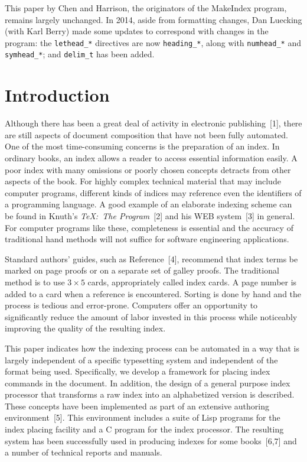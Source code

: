 This paper by Chen and Harrison, the originators of the MakeIndex
program, remains largely unchanged.  In 2014, aside from formatting
changes, Dan Luecking (with Karl Berry) made some updates to correspond
with changes in the program: the \verb|lethead_*| directives are now
\verb|heading_*|, along with \verb|numhead_*| and \verb|symhead_*|; and
\verb|delim_t| has been added.

\section{Introduction}
Although there has been a great deal of activity in
electronic publishing~[1],
there are still aspects of document composition that have not been
fully automated.
One of the most time-consuming concerns is the preparation of an index.
In ordinary books, an index allows a reader to
access essential information easily.
A poor index with many omissions or poorly chosen concepts
detracts from other aspects of the book.
For highly complex technical material that may include computer programs,
different kinds of indices may
reference even the identifiers of a programming language.  A good example
of an elaborate indexing scheme can be found in Knuth's
{\it {\TeX}:\ The Program\/}~[2] and his WEB system~[3] in general.
For computer programs like these,
completeness is essential and the accuracy of
traditional hand methods will not suffice for software engineering
applications.

Standard authors' guides, such as Reference~[4],
recommend that index terms be marked on page proofs or on a separate set of
galley proofs.
The traditional method is to use $3 \times 5$ cards, appropriately called
index cards.
A page number is added to a card when a reference is encountered.
Sorting is done by hand and the process is tedious and error-prone.
Computers offer an opportunity to significantly reduce the amount of labor
invested in this process while noticeably improving the quality of the
resulting index.

This paper indicates how the indexing process can be automated
in a way that is largely independent of a specific typesetting system
and independent of the format being used.
Specifically, we develop a framework for placing index
commands in the document.  In addition, the design of
a general purpose index processor that
transforms a raw index into an alphabetized version is described.
These concepts have been implemented as part of an extensive authoring
environment~[5].  This environment includes a suite of Lisp programs
for the index placing facility and a C program for the
index processor.  The resulting system has been successfully
used in producing indexes for some books~[6,7]
and a number of technical reports and manuals.

